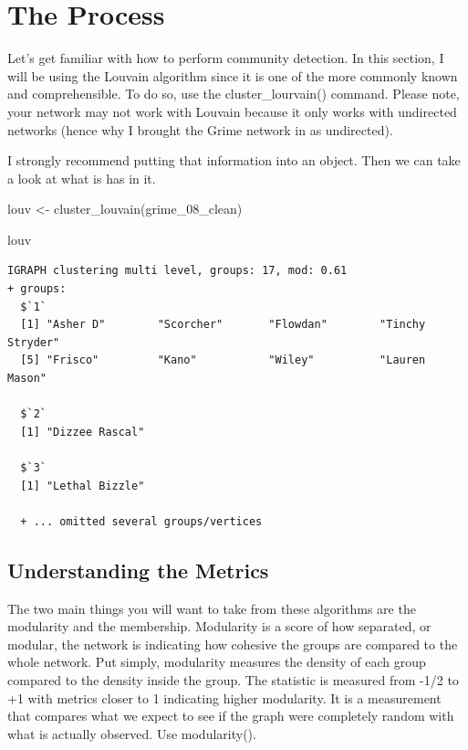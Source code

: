 \documentclass[
  letterpaper,
  DIV=11,
  numbers=noendperiod]{scrreprt}
\newenvironment{Shaded}{\begin{snugshade}}{\end{snugshade}}
\newcommand{\FunctionTok}[1]{\textcolor[rgb]{0.28,0.35,0.67}{#1}}
\newcommand{\NormalTok}[1]{\textcolor[rgb]{0.00,0.23,0.31}{#1}}
\newcommand{\OtherTok}[1]{\textcolor[rgb]{0.00,0.23,0.31}{#1}}
\begin{document}
\section{The Process}\label{the-process}

Let's get familiar with how to perform community detection. In this
section, I will be using the Louvain algorithm since it is one of the
more commonly known and comprehensible. To do so, use the
cluster\_lourvain() command. Please note, your network may not work with
Louvain because it only works with undirected networks (hence why I
brought the Grime network in as undirected).

I strongly recommend putting that information into an object. Then we
can take a look at what is has in it.

\begin{Shaded}
\begin{Highlighting}[]
\NormalTok{louv }\OtherTok{\textless{}{-}} \FunctionTok{cluster\_louvain}\NormalTok{(grime\_08\_clean)}

\NormalTok{louv}
\end{Highlighting}
\end{Shaded}

\begin{verbatim}
IGRAPH clustering multi level, groups: 17, mod: 0.61
+ groups:
  $`1`
  [1] "Asher D"        "Scorcher"       "Flowdan"        "Tinchy Stryder"
  [5] "Frisco"         "Kano"           "Wiley"          "Lauren Mason"  
  
  $`2`
  [1] "Dizzee Rascal"
  
  $`3`
  [1] "Lethal Bizzle"
  
  + ... omitted several groups/vertices
\end{verbatim}

\subsection{Understanding the Metrics}\label{understanding-the-metrics}

The two main things you will want to take from these algorithms are the
modularity and the membership. Modularity is a score of how separated,
or modular, the network is indicating how cohesive the groups are
compared to the whole network. Put simply, modularity measures the
density of each group compared to the density inside the group. The
statistic is measured from -1/2 to +1 with metrics closer to 1
indicating higher modularity. It is a measurement that compares what we
expect to see if the graph were completely random with what is actually
observed. Use modularity().
\end{document}
